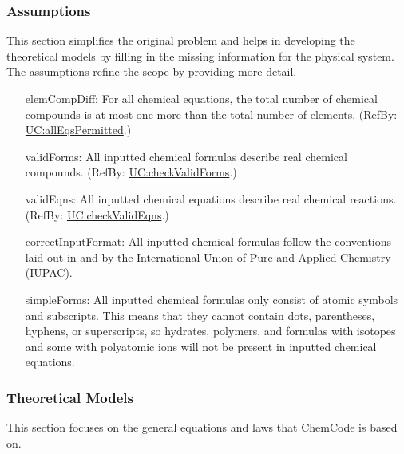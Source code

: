\documentclass[12pt]{article}
\begin{document}
\subsubsection{Assumptions}
\label{Sec:Assumps}
This section simplifies the original problem and helps in developing the theoretical models by filling in the missing information for the physical system. The assumptions refine the scope by providing more detail.

\begin{itemize}
\item[elemCompDiff:\phantomsection\label{elemCompDiff}]{For all chemical equations, the total number of chemical compounds is at most one more than the total number of elements. (RefBy: \hyperref[allEqsPermitted]{UC:allEqsPermitted}.)}
\item[validForms:\phantomsection\label{validForms}]{All inputted chemical formulas describe real chemical compounds. (RefBy: \hyperref[checkValidForms]{UC:checkValidForms}.)}
\item[validEqns:\phantomsection\label{validEqns}]{All inputted chemical equations describe real chemical reactions. (RefBy: \hyperref[checkValidEqns]{UC:checkValidEqns}.)}
\item[correctInputFormat:\phantomsection\label{correctInputFormat}]{All inputted chemical formulas follow the conventions laid out in \cite{inorganicIUPAC} and \cite{organicIUPAC} by the International Union of Pure and Applied Chemistry (IUPAC).}
\item[simpleForms:\phantomsection\label{simpleForms}]{All inputted chemical formulas only consist of atomic symbols and subscripts. This means that they cannot contain dots, parentheses, hyphens, or superscripts, so hydrates, polymers, and formulas with isotopes and some with polyatomic ions will not be present in inputted chemical equations.}
\end{itemize}
\subsubsection{Theoretical Models}
\label{Sec:TMs}
This section focuses on the general equations and laws that ChemCode is based on.
\end{document}

